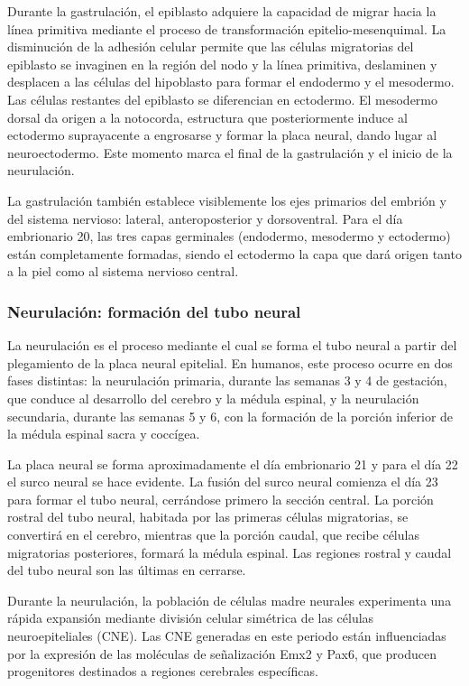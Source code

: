 \documentclass[11pt,letterpaper]{report}
\begin{document}
Durante la gastrulación, el epiblasto adquiere la capacidad de migrar hacia la
línea primitiva mediante el proceso de transformación epitelio-mesenquimal. La
disminución de la adhesión celular permite que las células migratorias del
epiblasto se invaginen en la región del nodo y la línea primitiva, deslaminen
y desplacen a las células del hipoblasto para formar el endodermo y el
mesodermo. Las células restantes del epiblasto se diferencian en ectodermo. El
mesodermo dorsal da origen a la notocorda, estructura que posteriormente induce
al ectodermo suprayacente a engrosarse y formar la placa neural, dando lugar al
neuroectodermo. Este momento marca el final de la gastrulación y el inicio de
la neurulación. \cite{Polin124}

La gastrulación también establece visiblemente los ejes primarios del embrión y
del sistema nervioso: lateral, anteroposterior y dorsoventral. Para el día
embrionario 20, las tres capas germinales (endodermo, mesodermo y ectodermo)
están completamente formadas, siendo el ectodermo la capa que dará origen tanto
a la piel como al sistema nervioso central. \cite{Polin124}

\subsubsection{Neurulación: formación del tubo neural}
La neurulación es el proceso mediante el cual se forma el tubo neural a partir
del plegamiento de la placa neural epitelial. En humanos, este proceso ocurre
en dos fases distintas: la neurulación primaria, durante las semanas 3 y 4 de
gestación, que conduce al desarrollo del cerebro y la médula espinal, y la
neurulación secundaria, durante las semanas 5 y 6, con la formación de la
porción inferior de la médula espinal sacra y coccígea. \cite{Polin124}

La placa neural se forma aproximadamente el día embrionario 21 y para el día 22
el surco neural se hace evidente. La fusión del surco neural comienza el día 23
para formar el tubo neural, cerrándose primero la sección central. La porción
rostral del tubo neural, habitada por las primeras células migratorias, se
convertirá en el cerebro, mientras que la porción caudal, que recibe células
migratorias posteriores, formará la médula espinal. Las regiones rostral y
caudal del tubo neural son las últimas en cerrarse. \cite{Gibb2018}

Durante la neurulación, la población de células madre neurales experimenta una
rápida expansión mediante división celular simétrica de las células
neuroepiteliales (CNE). Las CNE generadas en este periodo están influenciadas
por la expresión de las moléculas de señalización Emx2 y Pax6, que producen
progenitores destinados a regiones cerebrales específicas. \cite{Gibb2018}
\end{document}
